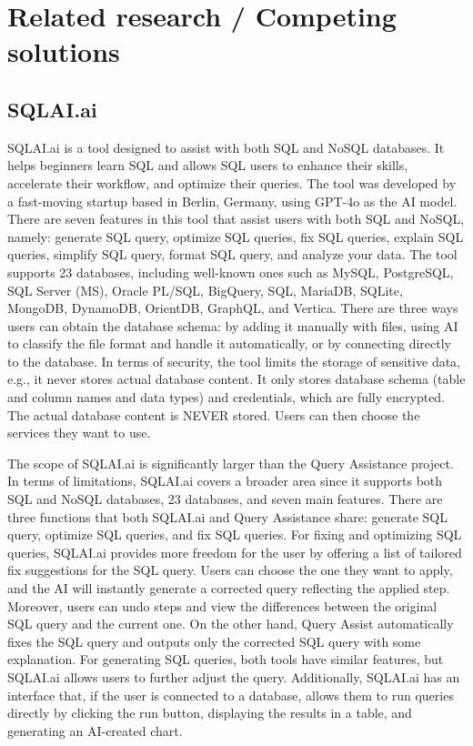 \section{Related research / Competing solutions}
    \subsection{SQLAI.ai}
    SQLAI.ai is a tool designed to assist with both SQL and NoSQL databases. It helps beginners learn SQL and allows SQL users to enhance their skills, accelerate their workflow, and optimize their queries. The tool was developed by a fast-moving startup based in Berlin, Germany, using GPT-4o as the AI model. There are seven features in this tool that assist users with both SQL and NoSQL, namely: generate SQL query, optimize SQL queries, fix SQL queries, explain SQL queries, simplify SQL query, format SQL query, and analyze your data. The tool supports 23 databases, including well-known ones such as MySQL, PostgreSQL, SQL Server (MS), Oracle PL/SQL, BigQuery, SQL, MariaDB, SQLite, MongoDB, DynamoDB, OrientDB, GraphQL, and Vertica. There are three ways users can obtain the database schema: by adding it manually with files, using AI to classify the file format and handle it automatically, or by connecting directly to the database. In terms of security, the tool limits the storage of sensitive data, e.g., it never stores actual database content. It only stores database schema (table and column names and data types) and credentials, which are fully encrypted. The actual database content is NEVER stored. Users can then choose the services they want to use.
    
    The scope of SQLAI.ai is significantly larger than the Query Assistance project. In terms of limitations, SQLAI.ai covers a broader area since it supports both SQL and NoSQL databases, 23 databases, and seven main features. There are three functions that both SQLAI.ai and Query Assistance share: generate SQL query, optimize SQL queries, and fix SQL queries. For fixing and optimizing SQL queries, SQLAI.ai provides more freedom for the user by offering a list of tailored fix suggestions for the SQL query. Users can choose the one they want to apply, and the AI will instantly generate a corrected query reflecting the applied step. Moreover, users can undo steps and view the differences between the original SQL query and the current one. On the other hand, Query Assist automatically fixes the SQL query and outputs only the corrected SQL query with some explanation. For generating SQL queries, both tools have similar features, but SQLAI.ai allows users to further adjust the query. Additionally, SQLAI.ai has an interface that, if the user is connected to a database, allows them to run queries directly by clicking the run button, displaying the results in a table, and generating an AI-created chart.

